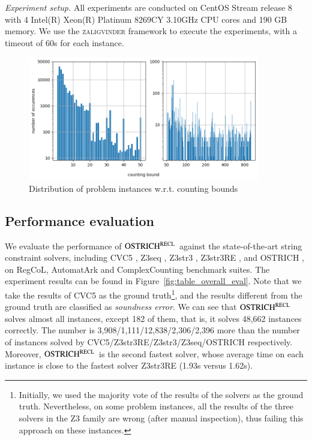 \medskip
\noindent
\emph{Experiment setup.}
All experiments are conducted on CentOS Stream release 8 with 4 Intel(R) Xeon(R) Platinum 8269CY 3.10GHz CPU cores and 190 GB memory. We use the \textsc{zaligvinder} framework \cite{zaligvinder_2021} to execute the experiments, with a timeout of 60s for each instance.


%
\begin{figure}
  \centering\vskip 0pt
  \includegraphics[width=0.9\textwidth]{counting_distribution.png}  
  \caption{Distribution of problem instances w.r.t. counting bounds}  
  \label{fig:count_distri}
\end{figure}

\subsection{Performance evaluation}\label{subsec:overall_eval}

We evaluate the performance of $\rm OSTRICH^{RECL}$ against the state-of-the-art string constraint solvers, including CVC5
\cite{cvc5}, Z3seq \cite{z3seq}, Z3str3
\cite{Z3-str3}, Z3str3RE \cite{BD+23}, and OSTRICH
\cite{CHL+19}, on RegCoL, AutomatArk and ComplexCounting benchmark suites.
The experiment results can be found in Figure~\ref{fig:table_overall_eval}. Note that we take the results of CVC5 as the ground truth\footnote{Initially,  we used the majority vote of the results of the solvers as the ground truth. Nevertheless, on some problem instances, all the results of the three solvers in the Z3 family are wrong (after manual inspection), thus failing this approach on these instances.}, and the results different from the ground truth are classified as \emph{soundness error}. We can see that $\rm OSTRICH^{RECL}$ solves almost all  instances, except 182 of them, that is, it solves 48,662 instances correctly. The number is 3,908/1,111/12,838/2,306/2,396 more than the number of instances solved by CVC5/Z3str3RE/Z3str3/Z3seq/OSTRICH respectively.
%
Moreover, $\rm OSTRICH^{RECL}$ is the second fastest solver, whose average time on each instance is close to the fastest solver Z3str3RE (1.93s versus 1.62s). 

